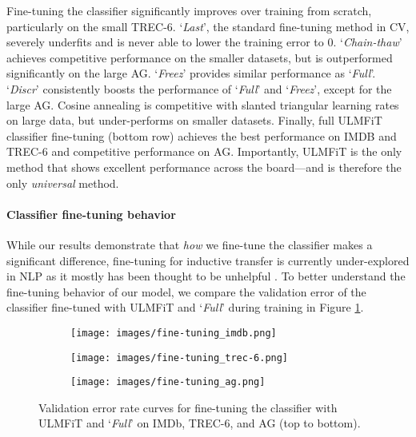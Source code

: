 \documentclass[11pt,a4paper]{article}
\begin{document}
Fine-tuning the classifier significantly improves over training from scratch, particularly on the small TREC-6. `\emph{Last}', the standard fine-tuning method in CV, severely underfits and is never able to lower the training error to $0$. `\emph{Chain-thaw}' achieves competitive performance on the smaller datasets, but is outperformed significantly on the large AG. `\emph{Freez}' provides similar performance as `\emph{Full}'. `\emph{Discr}' consistently boosts the performance of `\emph{Full}' and `\emph{Freez}', except for the large AG. Cosine annealing is competitive with slanted triangular learning rates on large data, but under-performs on smaller datasets. Finally, full ULMFiT classifier fine-tuning (bottom row) achieves the best performance on IMDB and TREC-6 and competitive performance on AG. Importantly, ULMFiT is the only method that shows excellent performance across the board---and is therefore the only \emph{universal} method.

\paragraph{Classifier fine-tuning behavior} While our results demonstrate that \emph{how} we fine-tune the classifier makes a significant difference, fine-tuning for inductive transfer is currently under-explored in NLP as it mostly has been thought to be unhelpful \cite{Mou2016}. To better understand the fine-tuning behavior of our model, we compare the validation error of the classifier fine-tuned with ULMFiT and `\emph{Full}' during training in Figure \ref{fig:fine-tuning}.

\begin{figure}[!htb]
    \begin{subfigure}{\linewidth}
      \centering
         \texttt{[image: images/fine-tuning\_imdb.png]}
    \end{subfigure}\hspace{10cm}
    \begin{subfigure}{\linewidth}
      \centering
         \texttt{[image: images/fine-tuning\_trec-6.png]}
    \end{subfigure}
    \begin{subfigure}{\linewidth}
      \centering
         \texttt{[image: images/fine-tuning\_ag.png]}
    \end{subfigure}
    \caption{Validation error rate curves for fine-tuning the classifier with ULMFiT and `\emph{Full}' on IMDb, TREC-6, and AG (top to bottom).}
\label{fig:fine-tuning}
\end{figure}
\end{document}
